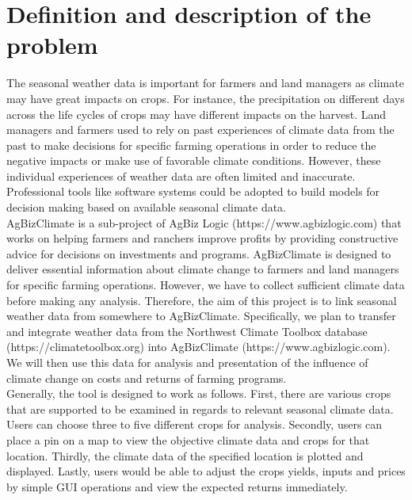 \documentclass[letterpaper,10pt]{article}
\begin{document}
    \section*{Definition and description of the problem}
    The seasonal weather data is important for farmers and land managers as climate may have great impacts on crops. For instance, the precipitation on different days across the life cycles of crops may have different impacts on the harvest. Land managers and farmers used to rely on past experiences of climate data from the past to make decisions for specific farming operations in order to reduce the negative impacts or make use of favorable climate conditions. However, these individual experiences of weather data are often limited and inaccurate. Professional tools like software systems could be adopted to build models for decision making based on available seasonal climate data.\\
    
    AgBizClimate is a sub-project of AgBiz Logic (https://www.agbizlogic.com) that works on helping farmers and ranchers improve profits by providing constructive advice for decisions on investments and programs. AgBizClimate is designed to deliver essential information about climate change to farmers and land managers for specific farming operations. However, we have to collect sufficient climate data before making any analysis. Therefore, the aim of this project is to link seasonal weather data from somewhere to AgBizClimate. Specifically, we plan to transfer and integrate weather data from the Northwest Climate Toolbox database (https://climatetoolbox.org) into AgBizClimate (https://www.agbizlogic.com). We will then use this data for analysis and presentation of the influence of climate change on costs and returns of farming programs.\\
    
    Generally, the tool is designed to work as follows. First, there are various crops that are supported to be examined in regards to  relevant seasonal climate data. Users can choose three to five different crops for analysis. Secondly, users can place a pin on a map to view the objective climate data and crops for that location. Thirdly, the climate data of the specified location is plotted and displayed. Lastly, users would be able to adjust the crops yields, inputs and prices by simple GUI operations and view the expected returns immediately.\\
    
\end{document}
